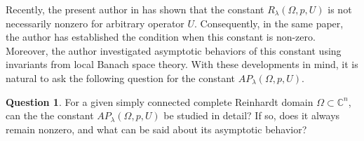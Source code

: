 \documentclass[a4paper,11pt, reqno]{amsart}
\theoremstyle{definition}
\newtheorem{defn}{Definition}[section]
\newtheorem{qsn}{Question} [section]
\newcounter {own}
\newcommand{\norm}[1]{\left\lVert#1\right\rVert}
\newcommand{\comment}[1]{}
\begin{document}
	
	
	Recently, the present author in \cite{Himadri-local-Banach-1} has shown that the constant $R_{\lambda}(\Omega, p,U)$ is not necessarily nonzero for arbitrary operator $U$. Consequently, in the same paper, the author has established the condition when this constant is non-zero. Moreover, the author investigated asymptotic behaviors of this constant using invariants from local Banach space theory. With these developments in mind, it is natural to ask the following question for the constant $AP_{\lambda}(\Omega, p,U)$.
	\begin{qsn} \label{qsn-1.1}
		For a given simply connected complete Reinhardt domain $\Omega \subset \mathbb{C}^n$, can the the constant $AP_{\lambda}(\Omega, p,U)$ be studied in detail? If so, does it always remain nonzero, and what can be said about its asymptotic behavior?
	\end{qsn}
	
	\comment{\begin{defn} \label{def-1.1}
			Let $X=\mathcal{B}(\mathcal{H})$ and $Y$ be any complex Banach space. Let $\Omega\subset \mathbb{C}^n$ be a simply connected complete Reinhardt domain and $n\in \mathbb{N}$. Let $U:X\rightarrow Y$ be a bounded liner operator and $\norm{U} \leq \lambda$. For $1 \leq p < \infty$, the $\lambda$-powered Bohr radius of $U$, denoted by $R_{\lambda}(\Omega, p,U)$, is defined to be the supremum of all $r\geq 0$ such that for all $f \in \mathcal{PH}(\Omega,X)$ of the form \eqref{e-1.3-a} we have 
			\begin{equation} \label{e-1.4-a}
				\sup_{z \in r\Omega}\,\sum_{m=0}^{\infty} \sum_{|\alpha|=m} (\norm{U(a_{\alpha})}^p_{Y} + \norm{U(b_{\alpha})}^p_{Y})|z^\alpha|^p \leq \lambda^p\,\norm{f}^p_{\Omega,X}. 
			\end{equation}
		\end{defn}
		\noindent Set $R(\Omega, p,U):=R_{1}(\Omega, p,U)$, $R_{\lambda}(\Omega, p,X):=R_{\lambda}(\Omega, p,U)$ whenever $U=I:X\rightarrow X$, $R(\Omega, p,X):=R_{1}(\Omega, p,X)$, $R_{\lambda}(\Omega, p):=R_{\lambda}(\Omega, p,\mathbb{C})$, and $R(\Omega,p):=R_1(\Omega,p)$. The asymptotic behaviour of the constants $R(\Omega,1)$ and $R(\Omega,p)$ have been studied in \cite{hamada-JFA-2022,das-2024} whenever $\Omega=B_{\ell^n _q}$.}
	
\end{document}

